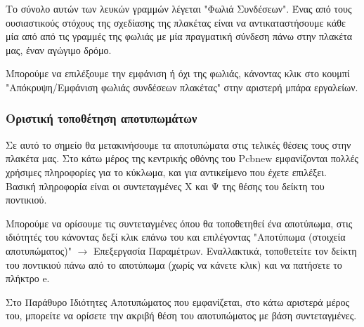 \documentclass[a4paper]{article}
\begin{document}
Το σύνολο αυτών των λευκών γραμμών λέγεται "Φωλιά Συνδέσεων". Ένας από τους ουσιαστικούς στόχους της σχεδίασης της πλακέτας είναι να αντικαταστήσουμε κάθε μία από από τις γραμμές της φωλιάς με μία πραγματική σύνδεση πάνω στην πλακέτα μας, έναν αγώγιμο δρόμο. 

Μπορούμε να επιλέξουμε την εμφάνιση ή όχι της φωλιάς, κάνοντας κλικ στο κουμπί "Απόκρυψη/Εμφάνιση φωλιάς συνδέσεων πλακέτας" στην αριστερή μπάρα εργαλείων.

\begin{figure}
  \begin{center}
    \label{fig:kicad-main}
  \end{center}
\end{figure}


\subsubsection{Οριστική τοποθέτηση αποτυπωμάτων}

Σε αυτό το σημείο θα μετακινήσουμε τα αποτυπώματα στις τελικές θέσεις τους στην πλακέτα μας. Στο κάτω μέρος της κεντρικής οθόνης του \textenglish{Pcbnew} εμφανίζονται πολλές χρήσιμες πληροφορίες για το κύκλωμα, και για αντικείμενο που έχετε επιλέξει. Βασική πληροφορία είναι οι συντεταγμένες Χ και Ψ της θέσης του δείκτη του ποντικιού.

Μπορούμε να ορίσουμε τις συντεταγμένες όπου θα τοποθετηθεί ένα αποτύπωμα, στις ιδιότητές του κάνοντας δεξί κλικ επάνω του και επιλέγοντας "Αποτύπωμα (στοιχεία αποτυπώματος)" $\rightarrow$ Επεξεργασία Παραμέτρων. Εναλλακτικά, τοποθετείτε τον δείκτη του ποντικιού πάνω από το αποτύπωμα (χωρίς να κάνετε κλικ) και να πατήσετε το πλήκτρο e.

Στο Παράθυρο Ιδιότητες Αποτυπώματος που εμφανίζεται, στο κάτω αριστερά μέρος του, μπορείτε να ορίσετε την ακριβή θέση του αποτυπώματος με βάση συντεταγμένες.

\begin{figure}
  \begin{center}
    \label{fig:kicad-main}
  \end{center}
\end{figure}
\end{document}
